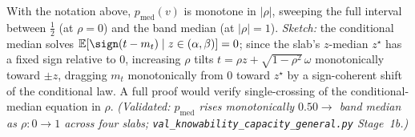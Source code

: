 \begin{lemma}\label{lem:gen-pmed-mono}
With the notation above, $p_{\mathrm{med}}(v)$ is monotone in $|\rho|$, sweeping the full
interval between $\tfrac12$ (at $\rho=0$) and the band median (at $|\rho|=1$).
\emph{Sketch:} the conditional median solves
$\mathbb E[\sign(t-m_t)\mid z\in(\alpha,\beta)]=0$; since the slab's $z$-median $z^\star$
has a fixed sign relative to $0$, increasing $\rho$ tilts $t=\rho z+\sqrt{1-\rho^2}\,\omega$
monotonically toward $\pm z$, dragging $m_t$ monotonically from $0$ toward $z^\star$ by a
sign-coherent shift of the conditional law. A full proof would verify single-crossing of
the conditional-median equation in $\rho$. \emph{(Validated: $p_{\mathrm{med}}$ rises
monotonically $0.50\to$ band median as $\rho:0\to1$ across four slabs;
\texttt{val\_knowability\_capacity\_general.py} Stage~1b.)}
\end{lemma}

